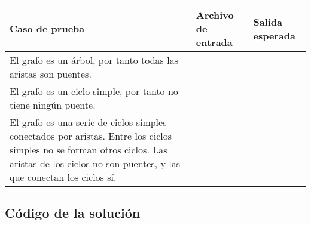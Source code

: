\begin{flushleft}
\begin{tabulary}{\textwidth}{@{}|L|L|L|@{}}
\hline
\textbf{Caso de prueba} & \textbf{Archivo de entrada} & \textbf{Salida esperada} \\
\hline
El grafo es un árbol, por tanto todas las aristas son puentes. 
&  &  \\ \hline
El grafo es un ciclo simple, por tanto no tiene ningún puente. 
&  &  \\ \hline
El grafo es una serie de ciclos simples conectados por aristas. Entre los ciclos simples no se 
forman otros ciclos. Las aristas de los ciclos no son puentes, y las que conectan los ciclos sí. &  &  \\
\hline
\end{tabulary}
\end{flushleft}

\newpage
\subsection{Código de la solución}

